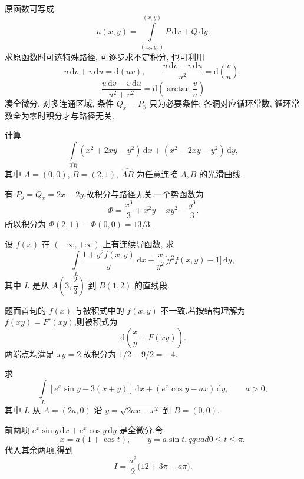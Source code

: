 \begin{remark}
    原函数可写成
    \[
        u(x,y)=\int\limits_{(x_0,y_0)}^{(x,y)}P\,\mathrm{d}x+Q\,\mathrm{d}y.
    \]
    求原函数时可选特殊路径, 可逐步求不定积分, 也可利用
    \[
        u\,\mathrm{d}v+v\,\mathrm{d}u=\mathrm{d}(uv),
        \qquad
        \dfrac{u\,\mathrm{d}v-v\,\mathrm{d}u}{u^2}=\mathrm{d}\left(\dfrac{v}{u}\right),
    \]
    \[
        \dfrac{u\,\mathrm{d}v-v\,\mathrm{d}u}{u^2+v^2}=\mathrm{d}\left(\arctan\dfrac{v}{u}\right)
    \]
    凑全微分. 对多连通区域, 条件 $Q_x=P_y$ 只为必要条件; 各洞对应循环常数, 循环常数全为零时积分才与路径无关.
\end{remark}

\begin{example}
    计算
    \[
        \int\limits_{\widehat{AB}}(x^2+2xy-y^2)\,\mathrm{d}x+(x^2-2xy-y^2)\,\mathrm{d}y,
    \]
    其中 $A=(0,0)$, $B=(2,1)$, $\widehat{AB}$ 为任意连接 $A,B$ 的光滑曲线.
\end{example}
\exampleblank

\begin{solution}
    有 $P_y=Q_x=2x-2y$,故积分与路径无关.一个势函数为
    \[
        \Phi=\dfrac{x^3}{3}+x^2y-xy^2-\dfrac{y^3}{3}.
    \]
    所以积分为 $\Phi(2,1)-\Phi(0,0)=13/3$.
\end{solution}

\begin{example}
    设 $f(x)$ 在 $(-\infty,+\infty)$ 上有连续导函数, 求
    \[
        \int\limits_L
        \dfrac{1+y^2f(x,y)}{y}\,\mathrm{d}x
        +\dfrac{x}{y^2}\bigl\lbrack y^2f(x,y)-1\bigr\rbrack\,\mathrm{d}y,
    \]
    其中 $L$ 是从 $A(3,\dfrac{2}{3})$ 到 $B(1,2)$ 的直线段.
\end{example}
\exampleblank

\begin{solution}
    题面首句的 $f(x)$ 与被积式中的 $f(x,y)$ 不一致.若按结构理解为 $f(xy)=F'(xy)$,则被积式为
    \[
        \mathrm{d}\left(\dfrac{x}{y}+F(xy)\right).
    \]
    两端点均满足 $xy=2$,故积分为 $1/2-9/2=-4$.
\end{solution}

\begin{example}
    求
    \[
        \int\limits_L[ e^x\sin y-3(x+y)]\,\mathrm{d}x+(e^x\cos y-ax)\,\mathrm{d}y,
        \qquad a>0,
    \]
    其中 $L$ 从 $A=(2a,0)$ 沿 $y=\sqrt{2ax-x^2}$ 到 $B=(0,0)$.
\end{example}
\exampleblank

\begin{solution}
    前两项 $e^x\sin y\,\mathrm{d}x+e^x\cos y\,\mathrm{d}y$ 是全微分.令
    \[
        x=a(1+\cos t),\qquad y=a\sin t,qquad0\leq t\leq\pi,
    \]
    代入其余两项,得到
    \[
        I=\dfrac{a^2}{2}\bigl(12+3\pi-a\pi\bigr).
    \]
\end{solution}

